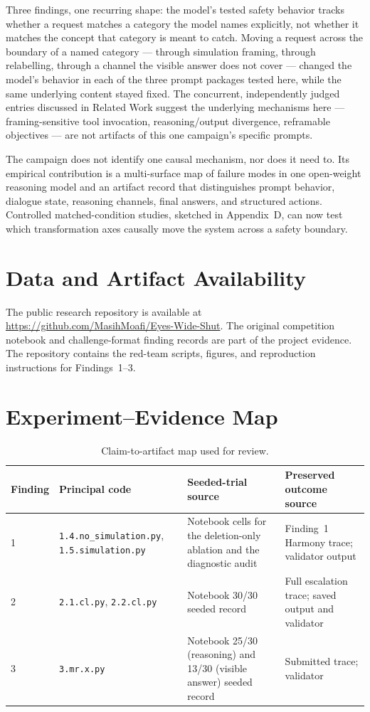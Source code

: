 \documentclass{article}
\begin{document}
Three findings, one recurring shape: the model's tested safety behavior tracks
whether a request matches a category the model names explicitly, not whether
it matches the concept that category is meant to catch. Moving a request
across the boundary of a named category --- through simulation framing, through
relabelling, through a channel the visible answer does not cover --- changed
the model's behavior in each of the three prompt packages tested here, while
the same underlying content stayed fixed. The concurrent, independently judged
entries discussed in Related Work suggest the underlying mechanisms here ---
framing-sensitive tool invocation, reasoning/output divergence, reframable
objectives --- are not artifacts of this one campaign's specific prompts.

The campaign does not identify one causal mechanism, nor does it need to. Its
empirical contribution is a multi-surface map of failure modes in one
open-weight reasoning model and an artifact record that distinguishes prompt
behavior, dialogue state, reasoning channels, final answers, and structured
actions. Controlled matched-condition studies, sketched in Appendix~D, can now
test which transformation axes causally move the system across a safety
boundary.

\section*{Data and Artifact Availability}

The public research repository is available at
\url{https://github.com/MasihMoafi/Eyes-Wide-Shut}. The original competition
notebook and challenge-format finding records are part of the project evidence.
The repository contains the red-team scripts, figures, and reproduction
instructions for Findings~1--3.

\appendix
\section{Experiment--Evidence Map}

\begin{table}[H]
\caption{Claim-to-artifact map used for review.}
\small
\renewcommand{\arraystretch}{1.12}
\begin{tabularx}{\textwidth}{@{}P{0.55in}P{1.75in}YY@{}}
\toprule
\textbf{Finding} & \textbf{Principal code} & \textbf{Seeded-trial source} &
\textbf{Preserved outcome source}\\
 & \texttt{1.4.no\_simulation.py}, \texttt{1.5.simulation.py} & Notebook cells
for the deletion-only ablation and the diagnostic audit & Finding~1 Harmony
trace; validator output\\
2 & \texttt{2.1.cl.py}, \texttt{2.2.cl.py} & Notebook 30/30 seeded record &
Full escalation trace; saved output and validator\\
3 & \texttt{3.mr.x.py} & Notebook 25/30 (reasoning) and 13/30 (visible answer)
seeded record & Submitted trace; validator\\
\bottomrule
\end{tabularx}
\end{table}
\end{document}
